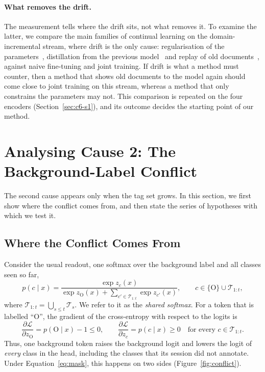 \paragraph{What removes the drift.} The measurement tells where the drift sits, not what
removes it. To examine the latter, we compare the main families of continual learning on the
domain-incremental stream, where drift is the only cause: regularisation of the
parameters~\citep{kirkpatrick2017ewc}, distillation from the previous
model~\citep{li2017lwf} and replay of old documents~\citep{rolnick2019er,buzzega2020der},
against naive fine-tuning and joint training. If drift is what a method must counter, then a
method that shows old documents to the model again should come close to joint training on
this stream, whereas a method that only constrains the parameters may not. This comparison is
repeated on the four encoders (Section~\ref{sec:c6-s1}), and its outcome decides the starting
point of our method.

\section{Analysing Cause 2: The Background-Label Conflict}
\label{sec:m-conflict}

The second cause appears only when the tag set grows. In this section, we first show where
the conflict comes from, and then state the series of hypotheses with which we test it.

\subsection{Where the Conflict Comes From}
\label{sec:m-conflict-origin}

Consider the usual readout, one softmax over the background label and all classes seen so
far,
\begin{equation}
  p(c\mid x)=\frac{\exp z_c(x)}{\exp z_{\mathrm{O}}(x)+\sum_{c'\in\mathcal{T}_{1:t}}\exp z_{c'}(x)},
  \qquad c\in\{\mathrm{O}\}\cup\mathcal{T}_{1:t},
  \label{eq:shared}
\end{equation}
where $\mathcal{T}_{1:t}=\bigcup_{s\le t}\mathcal{T}_s$. We refer to it as the \emph{shared
softmax}. For a token that is labelled ``O'', the gradient of the cross-entropy with respect
to the logits is
\begin{equation}
  \frac{\partial\mathcal{L}}{\partial z_{\mathrm{O}}}=p(\mathrm{O}\mid x)-1\le 0,\qquad
  \frac{\partial\mathcal{L}}{\partial z_c}=p(c\mid x)\ge 0\quad\text{for every } c\in\mathcal{T}_{1:t}.
  \label{eq:grad}
\end{equation}
Thus, one background token raises the background logit and lowers the logit of \emph{every}
class in the head, including the classes that its session did not annotate. Under
Equation~\eqref{eq:mask}, this happens on two sides (Figure~\ref{fig:conflict}).

